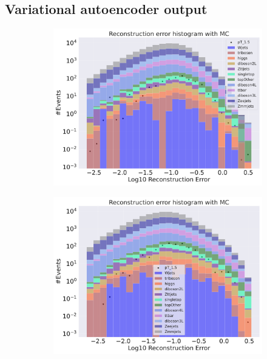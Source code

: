 \subsection*{Variational autoencoder output}

\begin{figure}[H]
    \centering
    \begin{subfigure}{.45\textwidth}
        \includegraphics[width=\textwidth]{Figures/VAE_testing/small/b_data_recon_big_rm3_feats_sig_pT_1.5.pdf}
        \caption{}
        \label{fig:VAE_small_pt_1_5}
    \end{subfigure}
    \hfill 
    \begin{subfigure}{.45\textwidth}
        \includegraphics[width=\textwidth]{Figures/VAE_testing/big/b_data_recon_big_rm3_feats_sig_pT_1.5.pdf}

\end{subfigure}
\end{figure}
